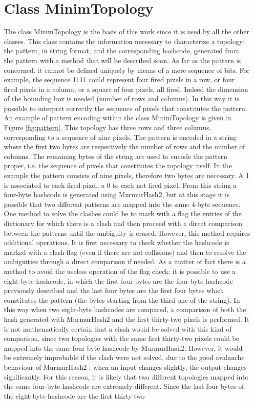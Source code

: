 \section{Class MinimTopology}
\label{sec:minim}
The class MinimTopology is the basis of this work since it is used by all the other classes. This class contains the information necessary to characterize a topology: the pattern, in string format, and the corresponding hashcode, generated from the pattern with a method that will be described soon. As far as the pattern is concerned, it cannot be defined uniquely by means of a mere sequence of bits. For example, the sequence 1111 could represent four fired pixels in a row, or four fired pixels in a column, or a square of four pixels, all fired. Indeed the dimension of the bounding box is needed (number of rows and columns). In this way it is possible to interpret correctly the sequence of pixels that constitutes the pattern. An example of pattern encoding within the class MinimTopology is given in Figure \ref{fig:pattern}. This topology has three rows and three columns, corresponding to a sequence of nine pixels. The pattern is encoded in a string where the first two bytes are respectively the number of rows and the number of columns. The remaining bytes of the string are used to encode the pattern proper, i.e. the sequence of pixels that constitutes the topology itself. In the example the pattern consists of nine pixels, therefore two bytes are necessary. A 1 is associated to each fired pixel, a 0 to each not fired pixel. From this string a four-byte hashcode is generated using MurmurHash2, but at this stage it is possible that two different patterns are mapped into the same 4-byte sequence. One method to solve the clashes could be to mark with a flag the entries of the dictionary for which there is a clash and then proceed with a direct comparison between the patterns until the ambiguity is erased. However, this method requires additional operations. It is first necessary to check whether the hashcode is marked with a clash-flag (even if there are not collisions) and then to resolve the ambiguities through a direct comparison if needed. As a matter of fact there is a method to avoid the useless operation of the flag check: it is possible to use a eight-byte hashcode, in which the first four bytes are the four-byte hashcode previously described and the last four bytes are the first four bytes which constitutes the pattern (the bytes starting from the third one of the string). In this way when two eight-byte hashcodes are compared, a comparison of both the hash generated with MurmurHash2 and the first thirty-two pixels is performed. It is not mathematically certain that a clash would be solved with this kind of comparison, since two topologies with the same first thirty-two pixels could be mapped into the same four-byte hashcode by MurmurHash2. However, it would be extremely improbable if the clash were not solved, due to the good avalanche behaviour of MurmurHash2 \cite{hash}: when an input changes slightly, the output changes significantly. For this reason, it is likely that two different topologies mapped into the same four-byte hashcode are extremely different. Since the last four bytes of the eight-byte hashcode are the first thirty-two 